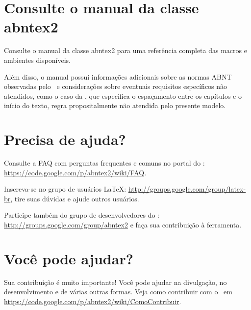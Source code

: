 


\section{Consulte o manual da classe \textsf{abntex2}}

Consulte o manual da classe \textsf{abntex2} \cite{abntex2classe} para uma
referência completa das macros e ambientes disponíveis. 

Além disso, o manual possui informações adicionais sobre as normas ABNT
observadas pelo \abnTeX\ e considerações sobre eventuais requisitos específicos
não atendidos, como o caso da , que
especifica o espaçamento entre os capítulos e o início do texto, regra
propositalmente não atendida pelo presente modelo.



\section{Precisa de ajuda?}

Consulte a FAQ com perguntas frequentes e comuns no portal do \abnTeX:
\url{https://code.google.com/p/abntex2/wiki/FAQ}.

Inscreva-se no grupo de usuários \LaTeX:
\url{http://groups.google.com/group/latex-br}, tire suas dúvidas e ajude
outros usuários.

Participe também do grupo de desenvolvedores do \abnTeX:
\url{http://groups.google.com/group/abntex2} e faça sua contribuição à
ferramenta.



\section{Você pode ajudar?}

Sua contribuição é muito importante! Você pode ajudar na divulgação, no
desenvolvimento e de várias outras formas. Veja como contribuir com o \abnTeX\
em \url{https://code.google.com/p/abntex2/wiki/ComoContribuir}.
